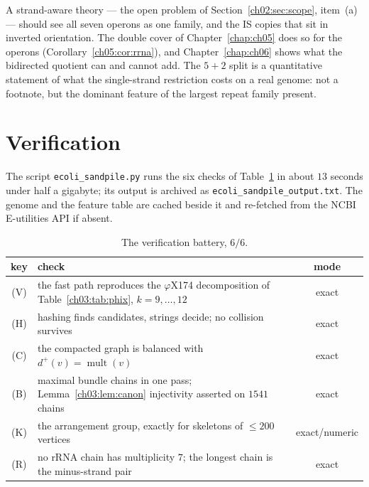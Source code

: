 \begin{remark}\label{ch15:rem:bidirected}
A strand-aware theory --- the open problem of Section~\ref{ch02:sec:scope}, item~(a) --- should
see all seven operons as one family, and the IS copies that sit in inverted orientation. The
double cover of Chapter~\ref{chap:ch05} does so for the operons (Corollary~\ref{ch05:cor:rrna}), and
Chapter~\ref{chap:ch06} shows what the bidirected quotient can and cannot add. The $5+2$ split is a
quantitative statement of what the single-strand restriction costs on a real genome: not a
footnote, but the dominant feature of the largest repeat family present.
\end{remark}

\section{Verification}\label{ch15:sec:battery}

The script \texttt{ecoli\_sandpile.py} runs the six checks of Table~\ref{ch15:tab:battery} in
about $13$ seconds under half a gigabyte; its output is archived as
\texttt{ecoli\_sandpile\_output.txt}. The genome and the feature table are cached beside
it and re-fetched from the NCBI E-utilities API if absent.

\begin{table}[ht]
\centering\small\setlength{\tabcolsep}{4pt}
\begin{tabular}{clc}
\toprule
key & check & mode\\
\midrule
(V) & the fast path reproduces the $\varphi$X174 decomposition of Table~\ref{ch03:tab:phix}, $k=9,\dots,12$ & exact\\
(H) & hashing finds candidates, strings decide; no collision survives & exact\\
(C) & the compacted graph is balanced with $d^{+}(v)=\operatorname{mult}(v)$ & exact\\
(B) & maximal bundle chains in one pass; Lemma~\ref{ch03:lem:canon} injectivity asserted on $1541$ chains & exact\\
(K) & the arrangement group, exactly for skeletons of $\le200$ vertices & exact/numeric\\
(R) & no rRNA chain has multiplicity $7$; the longest chain is the minus-strand pair & exact\\
\bottomrule
\end{tabular}
\caption{The verification battery, $6/6$.}
\label{ch15:tab:battery}
\end{table}

